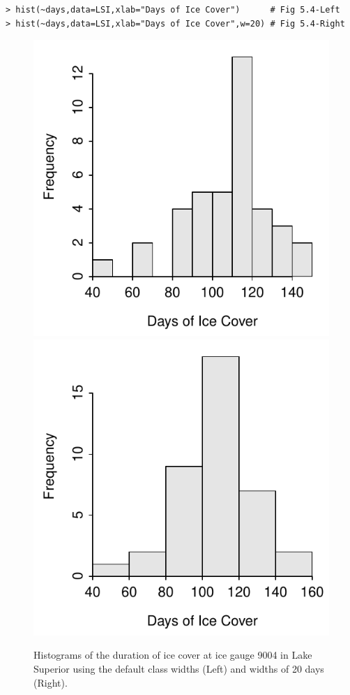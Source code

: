\documentclass[10pt,openany]{book}\usepackage[]{graphicx}\usepackage[]{color}
\makeatletter
\newenvironment{kframe}{%
 \def\at@end@of@kframe{}%
 \ifinner\ifhmode%
  \def\at@end@of@kframe{\end{minipage}}%
  \begin{minipage}{\columnwidth}%
 \fi\fi%
 \def\FrameCommand##1{\hskip\@totalleftmargin \hskip-\fboxsep
 \colorbox{shadecolor}{##1}\hskip-\fboxsep
     \hskip-\linewidth \hskip-\@totalleftmargin \hskip\columnwidth}%
 \MakeFramed {\advance\hsize-\width
   \@totalleftmargin\z@ \linewidth\hsize
   \@setminipage}}%
 {\par\unskip\endMakeFramed%
 \at@end@of@kframe}
\newenvironment{knitrout}{}{} %
\makeatother
\begin{document}
\begin{knitrout}
\color{fgcolor}\begin{kframe}
\begin{verbatim}
> hist(~days,data=LSI,xlab="Days of Ice Cover")      # Fig 5.4-Left
> hist(~days,data=LSI,xlab="Days of Ice Cover",w=20) # Fig 5.4-Right
\end{verbatim}
\end{kframe}\begin{figure}[hbtp]

{\centering \includegraphics[width=.4\linewidth]{Figs/Histogram1-1} 
\includegraphics[width=.4\linewidth]{Figs/Histogram1-2} 

}

\caption[Histograms of the duration of ice cover at ice gauge 9004 in Lake Superior using the default class widths (Left) and widths of 20 days (Right)]{Histograms of the duration of ice cover at ice gauge 9004 in Lake Superior using the default class widths (Left) and widths of 20 days (Right).}\label{fig:Histogram1}
\end{figure}


\end{knitrout}

\end{document}
